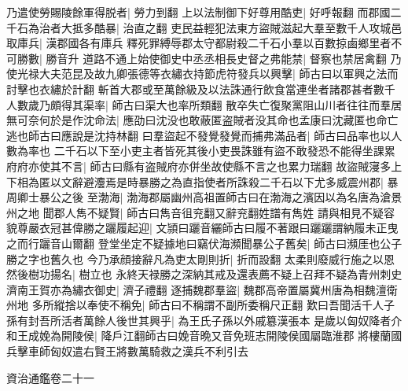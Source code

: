 乃遣使勞賜陵餘軍得脱者|{
	勞力到翻}
上以法制御下好尊用酷吏|{
	好呼報翻}
而郡國二千石為治者大抵多酷暴|{
	治直之翻}
吏民益輕犯法東方盜賊滋起大羣至數千人攻城邑取庫兵|{
	漢郡國各有庫兵}
釋死罪縛辱郡太守都尉殺二千石小羣以百數掠鹵鄉里者不可勝數|{
	勝音升}
道路不通上始使御史中丞丞相長史督之弗能禁|{
	督察也禁居禽翻}
乃使光禄大夫范昆及故九卿張德等衣繡衣持節虎符發兵以興擊|{
	師古曰以軍興之法而討擊也衣繡於計翻}
斬首大郡或至萬餘級及以法誅通行飲食當連坐者諸郡甚者數千人數歲乃頗得其渠率|{
	師古曰渠大也率所類翻}
散卒失亡復聚黨阻山川者往往而羣居無可奈何於是作沈命法|{
	應劭曰沈没也敢蔽匿盗賊者没其命也孟康曰沈藏匿也命亡逃也師古曰應說是沈持林翻}
曰羣盜起不發覺發覺而捕弗滿品者|{
	師古曰品率也以人數為率也}
二千石以下至小吏主者皆死其後小吏畏誅雖有盜不敢發恐不能得坐課累府府亦使其不言|{
	師古曰縣有盗賊府亦併坐故使縣不言之也累力瑞翻}
故盜賊寖多上下相為匿以文辭避灋焉是時暴勝之為直指使者所誅殺二千石以下尤多威震州郡|{
	暴周卿士暴公之後}
至渤海|{
	渤海郡屬幽州高祖置師古曰在渤海之濱因以為名唐為滄景州之地}
聞郡人雋不疑賢|{
	師古曰雋咅徂兖翻又辭兖翻姓譜有雋姓}
請與相見不疑容貌尊嚴衣冠甚偉勝之躧履起迎|{
	文頴曰躧音纚師古曰履不著跟曰躧躧謂納履未正曳之而行躧音山爾翻}
登堂坐定不疑據地曰竊伏海瀕聞暴公子舊矣|{
	師古曰瀕厓也公子勝之字也舊久也}
今乃承顔接辭凡為吏太剛則折|{
	折而設翻}
太柔則廢威行施之以恩然後樹功揚名|{
	樹立也}
永終天禄勝之深納其戒及還表薦不疑上召拜不疑為青州刺史濟南王賀亦為繡衣御史|{
	濟子禮翻}
逐捕魏郡羣盜|{
	魏郡高帝置屬冀州唐為相魏澶衛州地}
多所縱捨以奉使不稱免|{
	師古曰不稱謂不副所委稱尺正翻}
歎曰吾聞活千人子孫有封吾所活者萬餘人後世其興乎|{
	為王氏子孫以外戚簒漢張本}
是歲以匈奴降者介和王成娩為開陵侯|{
	降戶江翻師古曰娩音晩又音免班志開陵侯國屬臨淮郡}
將樓蘭國兵擊車師匈奴遣右賢王將數萬騎救之漢兵不利引去

資治通鑑卷二十一
